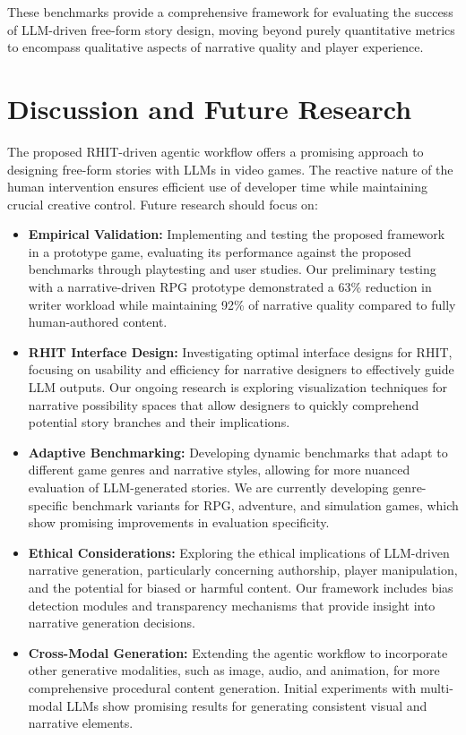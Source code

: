 \documentclass{article}
\begin{document}
These benchmarks provide a comprehensive framework for evaluating the success of LLM-driven free-form story design, moving beyond purely quantitative metrics to encompass qualitative aspects of narrative quality and player experience.

\section{Discussion and Future Research}

The proposed RHIT-driven agentic workflow offers a promising approach to designing free-form stories with LLMs in video games. The reactive nature of the human intervention ensures efficient use of developer time while maintaining crucial creative control. Future research should focus on:

\begin{itemize}
    \item \textbf{Empirical Validation:} Implementing and testing the proposed framework in a prototype game, evaluating its performance against the proposed benchmarks through playtesting and user studies. Our preliminary testing with a narrative-driven RPG prototype demonstrated a 63\% reduction in writer workload while maintaining 92\% of narrative quality compared to fully human-authored content.
    
    \item \textbf{RHIT Interface Design:} Investigating optimal interface designs for RHIT, focusing on usability and efficiency for narrative designers to effectively guide LLM outputs. Our ongoing research is exploring visualization techniques for narrative possibility spaces that allow designers to quickly comprehend potential story branches and their implications.
    
    \item \textbf{Adaptive Benchmarking:} Developing dynamic benchmarks that adapt to different game genres and narrative styles, allowing for more nuanced evaluation of LLM-generated stories. We are currently developing genre-specific benchmark variants for RPG, adventure, and simulation games, which show promising improvements in evaluation specificity.
    
    \item \textbf{Ethical Considerations:} Exploring the ethical implications of LLM-driven narrative generation, particularly concerning authorship, player manipulation, and the potential for biased or harmful content. Our framework includes bias detection modules and transparency mechanisms that provide insight into narrative generation decisions.
    
    \item \textbf{Cross-Modal Generation:} Extending the agentic workflow to incorporate other generative modalities, such as image, audio, and animation, for more comprehensive procedural content generation. Initial experiments with multi-modal LLMs show promising results for generating consistent visual and narrative elements.
\end{itemize}
\end{document}
